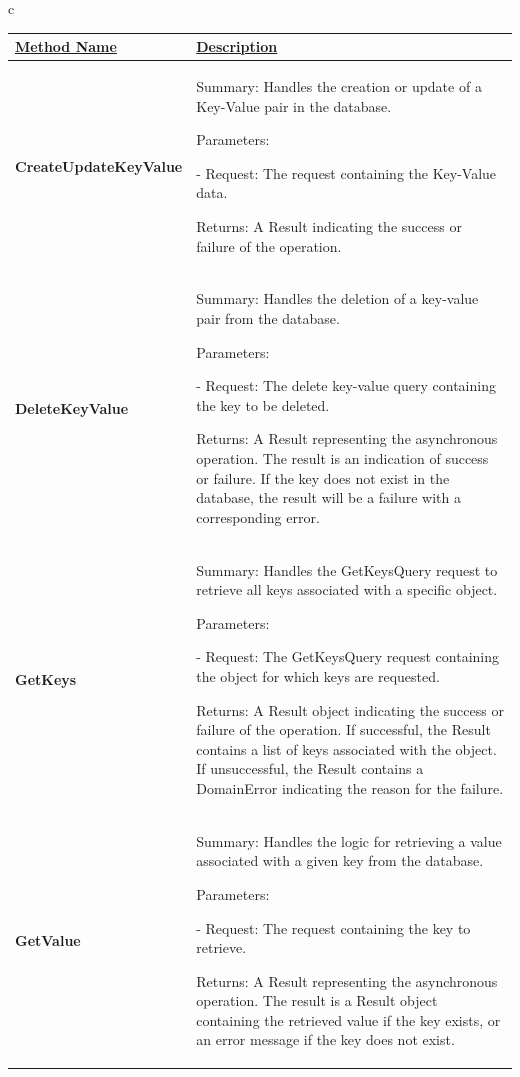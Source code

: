 \begin{longtable}{c}
    \renewcommand{\arraystretch}{1.2}
    \begin{tabular}{|p{0.25\linewidth}|p{0.75\linewidth}|}
\hline
    \underline{Method Name} & \underline{Description} 
\\
\hline
    \textbf{CreateUpdateKeyValue} & Summary: Handles the creation or update of a Key-Value pair in the database.

Parameters:

- Request: The request containing the Key-Value data.

Returns: A Result indicating the success or failure of the operation.
\\
\hline
    \textbf{DeleteKeyValue} & Summary: Handles the deletion of a key-value pair from the database.
    
Parameters:

- Request: The delete key-value query containing the key to be deleted.

Returns: A Result representing the asynchronous operation. The result is an indication of success or failure. If the key does not exist in the database, the result will be a failure with a corresponding error.
\\
\hline
    \textbf{GetKeys} & Summary: Handles the GetKeysQuery request to retrieve all keys associated with a specific object.
    
Parameters:

- Request: The GetKeysQuery request containing the object for which keys are requested.

Returns: A Result object indicating the success or failure of the operation. If successful, the Result contains a list of keys associated with the object. If unsuccessful, the Result contains a DomainError indicating the reason for the failure.
\\
\hline
    \textbf{GetValue} & Summary: Handles the logic for retrieving a value associated with a given key from the database.
    
Parameters:

- Request: The request containing the key to retrieve.

Returns: A Result representing the asynchronous operation. The result is a Result object containing the retrieved value if the key exists, or an error message if the key does not exist.
\\
        \hline
    \end{tabular}
\end{longtable}     



